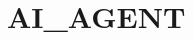 \chapter{AI\+\_\+\+AGENT}
\hypertarget{md__r_e_a_d_m_e}{}\label{md__r_e_a_d_m_e}
\label{md__r_e_a_d_m_e_autotoc_md0}%
%
